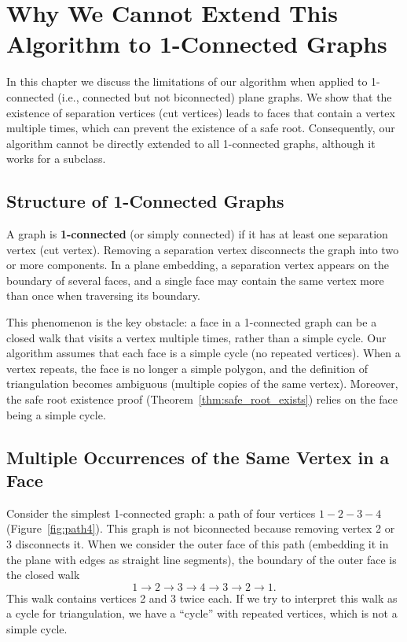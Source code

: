 
\chapter{Why We Cannot Extend This Algorithm to 1-Connected Graphs}
\label{ch:one_connected}

In this chapter we discuss the limitations of our algorithm when applied to 1-connected (i.e., connected but not biconnected) plane graphs. 
We show that the existence of separation vertices (cut vertices) leads to faces that contain a vertex multiple times, which can prevent the existence of a safe root. 
Consequently, our algorithm cannot be directly extended to all 1-connected graphs, although it works for a subclass.

\section{Structure of 1-Connected Graphs}
\label{sec:one_connected_structure}

A graph is \textbf{1-connected} (or simply connected) if it has at least one separation vertex (cut vertex). 
Removing a separation vertex disconnects the graph into two or more components. 
In a plane embedding, a separation vertex appears on the boundary of several faces, and a single face may contain the same vertex more than once when traversing its boundary.

This phenomenon is the key obstacle: a face in a 1-connected graph can be a closed walk that visits a vertex multiple times, rather than a simple cycle. 
Our algorithm assumes that each face is a simple cycle (no repeated vertices). 
When a vertex repeats, the face is no longer a simple polygon, and the definition of triangulation becomes ambiguous (multiple copies of the same vertex). 
Moreover, the safe root existence proof (Theorem~\ref{thm:safe_root_exists}) relies on the face being a simple cycle.

\section{Multiple Occurrences of the Same Vertex in a Face}
\label{sec:multiple_occurrences}

Consider the simplest 1-connected graph: a path of four vertices \(1-2-3-4\) (Figure~\ref{fig:path4}). 
This graph is not biconnected because removing vertex 2 or 3 disconnects it. 
When we consider the outer face of this path (embedding it in the plane with edges as straight line segments), the boundary of the outer face is the closed walk
\[
1 \to 2 \to 3 \to 4 \to 3 \to 2 \to 1.
\]
This walk contains vertices 2 and 3 twice each. 
If we try to interpret this walk as a cycle for triangulation, we have a “cycle” with repeated vertices, which is not a simple cycle.

